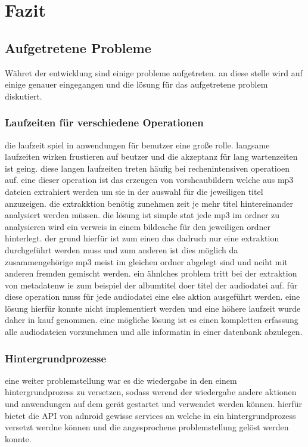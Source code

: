 \section{Fazit}
\subsection{Aufgetretene Probleme}
Währet der entwicklung sind einige probleme aufgetreten. an diese stelle wird auf einige genauer eingegangen und  die lösung für das aufgetretene problem diskutiert.
\subsubsection{Laufzeiten für verschiedene Operationen}
die laufzeit spiel in anwendungen für benutzer eine große rolle. langsame laufzeiten wirken frustieren auf beutzer und die akzeptanz für lang wartenzeiten ist geing. diese langen laufzeiten treten häufig bei rechenintensiven operatioen auf. eine dieser operation ist das erzeugen von vorshcaubildern welche aus mp3 dateien extrahiert werden um sie  in der auswahl für die jeweiligen titel anzuzeigen.
die extrakktion benötig zunehmen zeit je mehr titel hintereinander analysiert werden müssen. die lösung ist simple stat jede mp3 im ordner zu analysieren wird ein verweis in einem bildcache für den jeweiligen ordner hinterlegt. der grund hierfür ist zum einen das dadruch nur eine extraktion durchgeführt werden muss und zum anderen ist dies möglich da zusammengehörige mp3 meist im gleichen ordner abgelegt sind und nciht mit anderen fremden gemischt werden.
ein ähnlches problem tritt bei der extraktion von metadatenw ie zum beispiel der albumtitel doer titel der audiodatei auf. für diese operation muss für jede audiodatei eine else aktion ausgeführt werden. eine lösung hierfür konnte nicht implementiert werden und eine höhere laufzeit wurde daher in kauf genommen. eine mögliche lösung ist es einen kompletten erfassung alle audiodateien vorzunehmen und alle informatin in einer datenbank abzulegen.
\subsubsection{Hintergrundprozesse}
eine weiter problemstellung war es die wiedergabe in den einem hintergrundprozess zu versetzen, sodass werend der wiedergabe andere aktionen und anwendungen auf dem gerät gestartet und verwendet werden können. hierfür bietet die API von adnroid gewisse services an welche in ein hintergrundprozess versetzt werdne können und die angesprochene problemstellung gelöst werden konnte.

